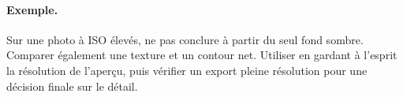\paragraph{Exemple.}
Sur une photo à ISO élevés, ne pas conclure à partir du seul fond sombre.
Comparer également une texture et un contour net. Utiliser 
en gardant à l’esprit la résolution de l’aperçu, puis vérifier un export pleine
résolution pour une décision finale sur le détail.

\gestesreglages
